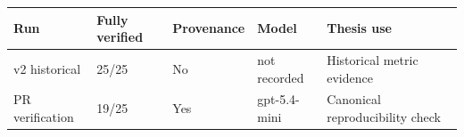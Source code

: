 \begin{tabular}{lllll}
\hline
Run & Fully verified & Provenance & Model & Thesis use \\
\hline
v2 historical & 25/25 & No & not recorded & Historical metric evidence \\
PR verification & 19/25 & Yes & gpt-5.4-mini & Canonical reproducibility check \\
\hline
\end{tabular}
\caption{Historical and provenance-backed remediation evidence}
